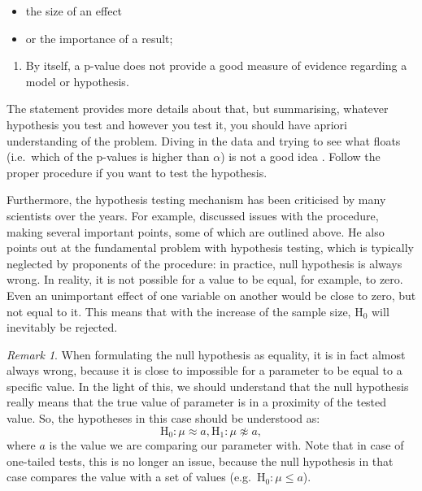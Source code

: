 \documentclass[
]{book}
\providecommand{\tightlist}{%
  \setlength{\itemsep}{0pt}\setlength{\parskip}{0pt}}
\theoremstyle{definition}
\theoremstyle{definition}
\theoremstyle{definition}
\theoremstyle{definition}
\theoremstyle{remark}
\newtheorem*{remark}{Remark}
\begin{document}
\begin{itemize}
\tightlist
\item
  the size of an effect
\item
  or the importance of a result;
\end{itemize}

\begin{enumerate}
\def\labelenumi{\arabic{enumi}.}
\setcounter{enumi}{5}
\tightlist
\item
  By itself, a p-value does not provide a good measure of evidence regarding a model or hypothesis.
\end{enumerate}

The statement provides more details about that, but summarising, whatever hypothesis you test and however you test it, you should have apriori understanding of the problem. Diving in the data and trying to see what floats (i.e.~which of the p-values is higher than \(\alpha\)) is not a good idea \citep{Wasserstein2016}. Follow the proper procedure if you want to test the hypothesis.

Furthermore, the hypothesis testing mechanism has been criticised by many scientists over the years. For example, \citet{Cohen1994} discussed issues with the procedure, making several important points, some of which are outlined above. He also points out at the fundamental problem with hypothesis testing, which is typically neglected by proponents of the procedure: in practice, null hypothesis is always wrong. In reality, it is not possible for a value to be equal, for example, to zero. Even an unimportant effect of one variable on another would be close to zero, but not equal to it. This means that with the increase of the sample size, \(\mathrm{H}_0\) will inevitably be rejected.

\begin{remark}
When formulating the null hypothesis as equality, it is in fact almost always wrong, because it is close to impossible for a parameter to be equal to a specific value. In the light of this, we should understand that the null hypothesis really means that the true value of parameter is in a proximity of the tested value. So, the hypotheses in this case should be understood as:
\begin{equation*}
    \mathrm{H}_0: \mu \approx a, \mathrm{H}_1: \mu \not\approx a ,
\end{equation*}
where \(a\) is the value we are comparing our parameter with. Note that in case of one-tailed tests, this is no longer an issue, because the null hypothesis in that case compares the value with a set of values (e.g.~\(\mathrm{H}_0: \mu\leq a\)).
\end{remark}
\end{document}
